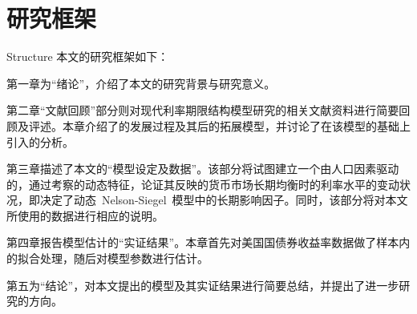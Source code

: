 \section{研究框架}{Structure}
本文的研究框架如下：

第一章为``绪论''，介绍了本文的研究背景与研究意义。

第二章``文献回顾''部分则对现代利率期限结构模型研究的相关文献资料进行简要回顾及评述。本章介绍了\dns 的发展过程及其后的拓展模型，并讨论了在该模型的基础上引入\dsf 的分析。

第三章描述了本文的``模型设定及数据''。该部分将试图建立一个由人口因素驱动的\dns{}，通过考察\ds 的动态特征，论证其反映的货币市场长期均衡时的利率水平的变动状况，即\dsf 决定了动态~Nelson-Siegel~模型中的长期影响因子。同时，该部分将对本文所使用的数据进行相应的说明。

第四章报告模型估计的``实证结果''。本章首先对美国国债券收益率数据做了样本内的拟合处理，随后对模型参数进行估计。

第五为``结论''，对本文提出的模型及其实证结果进行简要总结，并提出了进一步研究的方向。





